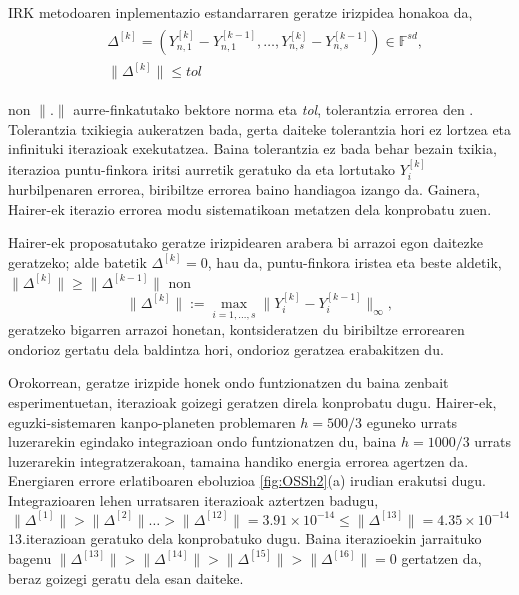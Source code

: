 IRK metodoaren inplementazio estandarraren geratze irizpidea honakoa da,
\begin{align}
\begin{split}
&\Delta^{[k]}=(Y_{n,1}^{[k]}-Y_{n,1}^{[k-1]},\dots,Y_{n,s}^{[k]}-Y_{n,s}^{[k-1]}) \in \mathbb{F}^{sd},\\
&\|\Delta^{[k]}\| \leqslant tol
\end{split}
\end{align} 

non $\|.\|$ aurre-finkatutako bektore norma eta \emph{tol}, tolerantzia errorea den . Tolerantzia txikiegia aukeratzen bada, gerta daiteke tolerantzia hori ez lortzea eta infinituki iterazioak exekutatzea. Baina tolerantzia ez bada behar bezain txikia, iterazioa puntu-finkora iritsi aurretik geratuko da eta lortutako $Y_i^{[k]}$ hurbilpenaren errorea, biribiltze errorea baino  handiagoa izango da. Gainera, Hairer-ek \cite{Hairer2008} iterazio errorea modu sistematikoan metatzen dela konprobatu zuen.   

Hairer-ek proposatutako geratze irizpidearen arabera bi arrazoi egon daitezke geratzeko; alde batetik $\Delta^{[k]} = 0$, hau da, puntu-finkora iristea eta beste aldetik, $\|\Delta^{[k]}\| \geqslant \|\Delta^{[k-1]}\|$ non    
\begin{equation*}
\|\Delta^{[k]}\|:= \max_{i=1,\dots,s} \|Y_i^{[k]}-Y_i^{[k-1]}\|_{\infty},
\end{equation*}
geratzeko bigarren arrazoi honetan, kontsideratzen du biribiltze errorearen ondorioz gertatu dela baldintza hori, ondorioz geratzea erabakitzen du. 

Orokorrean, geratze irizpide honek ondo funtzionatzen du baina zenbait esperimentuetan, iterazioak goizegi geratzen direla konprobatu dugu. Hairer-ek, eguzki-sistemaren kanpo-planeten problemaren $h=500/3$ eguneko urrats luzerarekin egindako integrazioan ondo funtzionatzen du, baina $h=1000/3$ urrats luzerarekin integratzerakoan, tamaina handiko energia errorea agertzen da. Energiaren errore erlatiboaren eboluzioa \ref{fig:OSSh2}(a) irudian erakutsi dugu. Integrazioaren lehen urratsaren iterazioak aztertzen badugu,
\begin{equation*}
\|\Delta^{[1]}\|>\|\Delta^{[2]}\| \dots > \|\Delta^{[12]}\|=3.91\times 10^{-14} \leqslant \|\Delta^{[13]}\|=4.35 \times 10^{-14} 
\end{equation*} 
$13.$iterazioan geratuko dela konprobatuko dugu. Baina iterazioekin jarraituko bagenu $\|\Delta^{[13]}\|>\|\Delta^{[14]}\|>\|\Delta^{[15]}\|>\|\Delta^{[16]}\|=0$ gertatzen da, beraz goizegi geratu dela esan daiteke.

